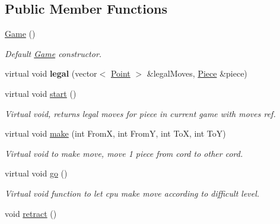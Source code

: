 \subsection*{Public Member Functions}
\begin{DoxyCompactItemize}
\item 
\hypertarget{class_game_ad59df6562a58a614fda24622d3715b65}{\hyperlink{class_game_ad59df6562a58a614fda24622d3715b65}{Game} ()}\label{class_game_ad59df6562a58a614fda24622d3715b65}

\begin{DoxyCompactList}\small\item\em Default \hyperlink{class_game}{Game} constructor. \end{DoxyCompactList}\item 
\hypertarget{class_game_a6e0ab8b7ceeecab810bbb69c183731d0}{virtual void {\bfseries legal} (vector$<$ \hyperlink{struct_point}{Point} $>$ \&legal\-Moves, \hyperlink{class_piece}{Piece} \&piece)}\label{class_game_a6e0ab8b7ceeecab810bbb69c183731d0}

\item 
virtual void \hyperlink{class_game_a3d9b98f7c4a96ecf578f75b96c9f0e90}{start} ()
\begin{DoxyCompactList}\small\item\em Virtual void, returns legal moves for piece in current game with moves ref. \end{DoxyCompactList}\item 
\hypertarget{class_game_a50b3e0e1e7a73793a9f9eae1b0660eff}{virtual void \hyperlink{class_game_a50b3e0e1e7a73793a9f9eae1b0660eff}{make} (int From\-X, int From\-Y, int To\-X, int To\-Y)}\label{class_game_a50b3e0e1e7a73793a9f9eae1b0660eff}

\begin{DoxyCompactList}\small\item\em Virtual void to make move, move 1 piece from cord to other cord. \end{DoxyCompactList}\item 
\hypertarget{class_game_a41fb865a89791da04f767fc5a12934a3}{virtual void \hyperlink{class_game_a41fb865a89791da04f767fc5a12934a3}{go} ()}\label{class_game_a41fb865a89791da04f767fc5a12934a3}

\begin{DoxyCompactList}\small\item\em Virtual void function to let cpu make move according to difficult level. \end{DoxyCompactList}\item 
\hypertarget{class_game_a9be0655102af94f1a37a7eaec1be36fc}{void \hyperlink{class_game_a9be0655102af94f1a37a7eaec1be36fc}{retract} ()}\label{class_game_a9be0655102af94f1a37a7eaec1be36fc}


\end{DoxyCompactItemize}
